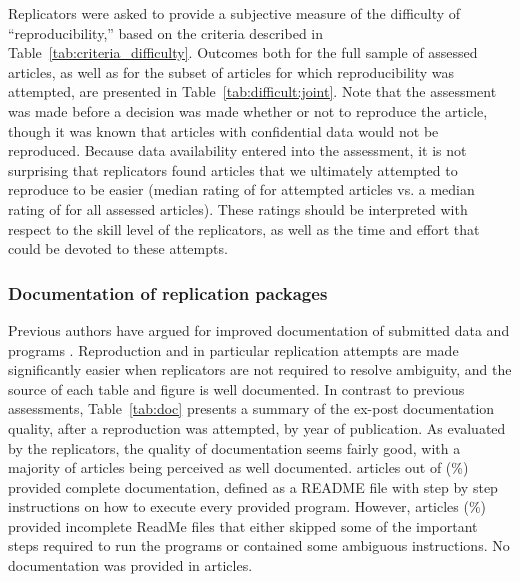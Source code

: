 Replicators were asked to provide a subjective measure of the difficulty of ``reproducibility,'' based on the criteria described in Table~\ref{tab:criteria_difficulty}. Outcomes both for the full sample of assessed articles, as well as for the subset of articles for which reproducibility was attempted, are presented in Table~\ref{tab:difficult:joint}. Note that the assessment was made before a decision was made whether or not to reproduce the article, though it was known that articles with confidential data would not be reproduced. Because data availability entered into the assessment, it is not surprising that replicators found articles that we ultimately attempted to reproduce to be easier (median rating of  for attempted articles vs. a median rating of  for all assessed articles). These ratings should be interpreted with respect to the skill level of the replicators, as well as the time and effort that could be devoted to these attempts.




\subsubsection{Documentation of replication packages}

Previous authors have argued for improved documentation of submitted data and programs \parencite{McCullough2006, ChangLi2015}. Reproduction and in particular replication attempts are made significantly easier when replicators are not required to resolve ambiguity,  and the source of each table and figure is well documented. In contrast to previous assessments, Table~\ref{tab:doc} presents a summary of the ex-post documentation quality, after a reproduction was attempted,  by  year of publication. As evaluated by the replicators, the quality of documentation seems fairly good, with a majority of articles being perceived as well documented.   articles out of  (\%) provided complete documentation, defined as a README file with step by step instructions on how to execute every provided program. However,  articles (\%)  provided incomplete ReadMe files that either skipped some of the important steps required to run the programs or contained some ambiguous instructions.  No documentation was provided in  articles.



